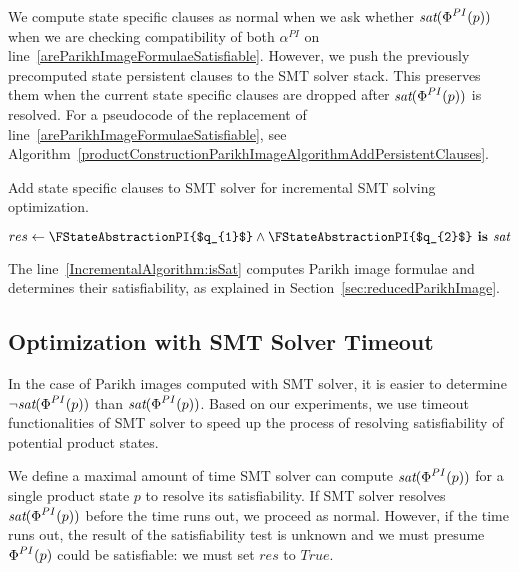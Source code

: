 We compute state specific clauses as normal when we ask whether $\emph{sat}(\emph{$\Phi$}^{PI}(p))$ when we are checking compatibility of both $\alpha^{PI}$ on line~\ref{areParikhImageFormulaeSatisfiable}. However, we push the previously precomputed state persistent clauses to the SMT solver stack. This preserves them when the current state specific clauses are dropped after $\emph{sat}(\emph{$\Phi$}^{PI}(p))$ is resolved. For a pseudocode of the replacement of line~\ref{areParikhImageFormulaeSatisfiable}, see Algorithm~\ref{productConstructionParikhImageAlgorithmAddPersistentClauses}.

\begin{algorithm}[ht]
\caption{Add state specific clauses to SMT solver for incremental SMT solving optimization.}\label{productConstructionParikhImageAlgorithmAddPersistentClauses}

\DontPrintSemicolon
\FSMTSolverPush{} \;
$res \gets \FStateAbstractionPI{$q_{1}$} \land \FStateAbstractionPI{$q_{2}$} \textbf{ is } \emph{sat} $ \;\label{IncrementalAlgorithm:isSat}
\FSMTSolverPop{} \;
\end{algorithm}

The line~\ref{IncrementalAlgorithm:isSat} computes Parikh image formulae and determines their satisfiability, as explained in Section~\ref{sec:reducedParikhImage}.


\subsection{Optimization with SMT Solver Timeout}

In the case of Parikh images computed with SMT solver, it is easier to determine $\neg \emph{sat}(\emph{$\Phi$}^{PI}(p))$ than $\emph{sat}(\emph{$\Phi$}^{PI}(p))$. Based on our experiments, we use timeout functionalities of SMT solver to speed up the process of resolving satisfiability of potential product states.

We define a maximal amount of time SMT solver can compute $\emph{sat}(\emph{$\Phi$}^{PI}(p))$ for a single product state $p$ to resolve its satisfiability. If SMT solver resolves $\emph{sat}(\emph{$\Phi$}^{PI}(p))$ before the time runs out, we proceed as normal. However, if the time runs out, the result of the satisfiability test is unknown and we must presume $\emph{$\Phi$}^{PI}(p)$ could be satisfiable: we must set $res$ to $True$.

